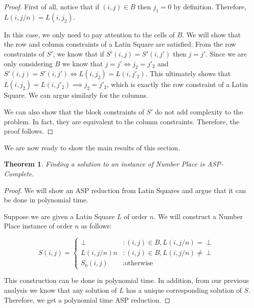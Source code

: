 \documentclass[11pt]{article}
\newtheorem{theorem}{Theorem}[section]
\begin{document}
\begin{proof} 

First of all, notice that if $(i, j) \in B$ then $j_1 = 0$ by definition. Therefore, $L(i, j/n) = L(i, j_2)$. 

In this case, we only need to pay attention to the cells of $B$. We will show that the row and column constraints of a Latin Square are satisfied. From the row constraints of $S'$, we know that if $S'(i,j) = S'(i,j')$ then $j = j'$. Since we are only considering $B$ we know that $j = j' \iff j_2 = j'_2$ and $S'(i,j) = S'(i,j') \iff L(i, j_2) = L(i, j'_2)$. This ultimately shows that $L(i, j_2) = L(i, j'_2) \implies j_2 = j'_2$, which is exactly the row constraint of a Latin Square. We can argue similarly for the columns. 

We can also show that the block constraints of $S'$ do not add complexity to the problem. In fact, they are equivalent to the column constraints. Therefore, the proof follows. 

\end{proof} 

We are now ready to show the main results of this section.

\begin{theorem} Finding a solution to an instance of Number Place is ASP-Complete. \end{theorem}

\begin{proof} We will show an ASP reduction from Latin Squares and argue that it can be done in polynomial time. 

Suppose we are given a Latin Square $L$ of order $n$. We will construct a Number Place instance of order $n$ as follows: 

\begin{displaymath}
   S(i,j) = \left\{
     \begin{array}{lr}
       \perp & : (i,j) \in B, L(i, j/n) = \perp \\
       L(i, j/n) n & : (i,j) \in B, L(i, j/n) \neq \perp \\
       S_0 (i,j) & : \text{otherwise}
     \end{array}
   \right.
\end{displaymath}

This construction can be done in polynomial time. In addition, from our previous analysis we know that any solution of $L$ has a unique corresponding solution of $S$. Therefore, we get a polynomial time ASP reduction. 

\end{proof}
\end{document}
